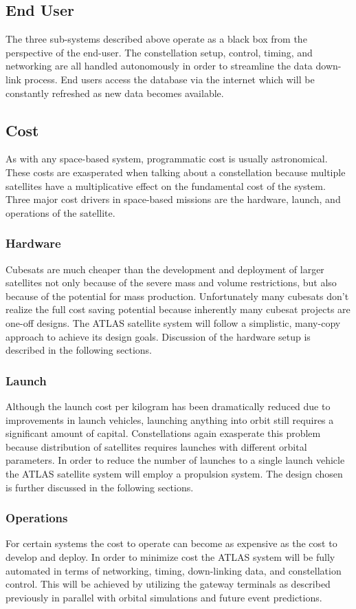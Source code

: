 \documentclass{article}
\begin{document}
\subsection{End User}
The three sub-systems described above operate as a black box from the perspective of the end-user. The constellation setup, control, timing, and networking are all handled autonomously in order to streamline the data down-link process. End users access the database via the internet which will be constantly refreshed as new data becomes available. 

\subsection{Cost}
As with any space-based system, programmatic cost is usually astronomical. These costs are exasperated when talking about a constellation because multiple satellites have a multiplicative effect on the fundamental cost of the system. Three major cost drivers in space-based missions are the hardware, launch, and operations of the satellite.
\subsubsection{Hardware}
Cubesats are much cheaper than the development and deployment of larger satellites not only because of the severe mass and volume restrictions, but also because of the potential for mass production. Unfortunately many cubesats don't realize the full cost saving potential because inherently many cubesat projects are one-off designs. The ATLAS satellite system will follow a simplistic, many-copy approach to achieve its design goals. Discussion of the hardware setup is described in the following sections. 
\subsubsection{Launch}
Although the launch cost per kilogram has been dramatically reduced due to improvements in launch vehicles, launching anything into orbit still requires a significant amount of capital. Constellations again exasperate this problem because distribution of satellites requires launches with different orbital parameters. In order to reduce the number of launches to a single launch vehicle the ATLAS satellite system will employ a propulsion system. The design chosen is further discussed in the following sections. 
\subsubsection{Operations}
For certain systems the cost to operate can become as expensive as the cost to develop and deploy. In order to minimize cost the ATLAS system will be fully automated in terms of networking, timing, down-linking data, and constellation control. This will be achieved by utilizing the gateway terminals as described previously in parallel with orbital simulations and future event predictions. 
\newpage
\end{document}
